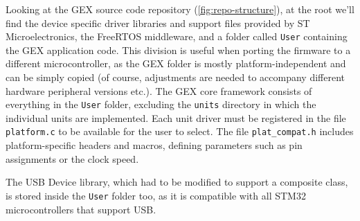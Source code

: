 Looking at the GEX source code repository (\cref{fig:repo-structure}), at the root we'll find the device specific driver libraries and support files provided by ST Microelectronics, the FreeRTOS middleware, and a folder called \verb|User| containing the GEX application code. This division is useful when porting the firmware to a different microcontroller, as the GEX folder is mostly platform-independent and can be simply copied (of course, adjustments are needed to accompany different hardware peripheral versions etc.). The GEX core framework consists of everything in the \verb|User| folder, excluding the \verb|units| directory in which the individual units are implemented. Each unit driver must be registered in the file \verb|platform.c| to be available for the user to select. The file \verb|plat_compat.h| includes platform-specific headers and macros, defining parameters such as pin assignments or the clock speed.

The \gls{USB} Device library, which had to be modified to support a composite class, is stored inside the \verb|User| folder too, as it is compatible with all STM32 microcontrollers that support \gls{USB}.












